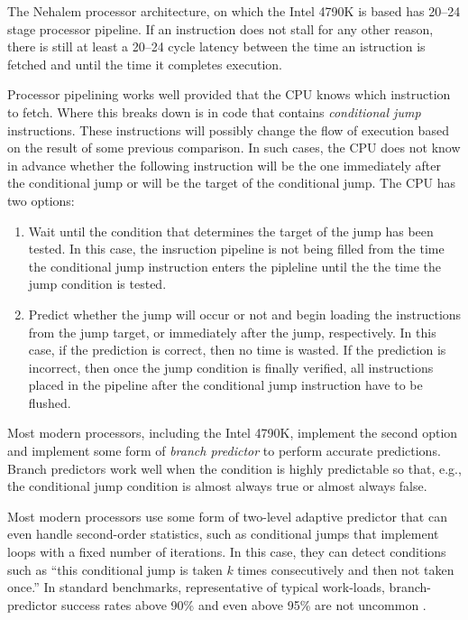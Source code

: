 \documentclass{patmorin}
\begin{document}
The Nehalem processor architecture, on which the Intel 4790K is based has
20--24 stage processor pipeline. If an instruction does not stall for any
other reason, there is still at least a 20--24 cycle latency between the
time an istruction is fetched and until the time it completes execution.

Processor pipelining works well provided that the CPU knows which
instruction to fetch.  Where this breaks down is in code that contains
\emph{conditional jump} instructions. These instructions will possibly
change the flow of execution based on the result of some previous
comparison.  In such cases, the CPU does not know in advance whether the
following instruction will be the one immediately after the conditional
jump or will be the target of the conditional jump. The CPU has two
options:
\begin{enumerate}
  \item Wait until the condition that determines the target
   of the jump has been tested. In this case, the insruction pipeline
   is not being filled from the time the conditional jump instruction
   enters the pipleline until the the time the jump condition is tested.

  \item Predict whether the jump will occur or not and begin loading
  the instructions from the jump target, or immediately after the jump,
  respectively.  In this case, if the prediction is correct, then no
  time is wasted. If the prediction is incorrect, then once the jump
  condition is finally verified, all instructions placed in the pipeline
  after the conditional jump instruction have to be flushed.
\end{enumerate}

Most modern processors, including the Intel 4790K, implement the second
option and implement some form of \emph{branch predictor} to perform
accurate predictions.  Branch predictors work well when the condition is
highly predictable so that, e.g., the conditional jump condition is almost
always true or almost always false.

Most modern processors use some form of two-level adaptive predictor
\cite{yeh.patt.two-level} that can even handle second-order statistics,
such as conditional jumps that implement loops with a fixed number of
iterations. In this case, they can detect conditions such as ``this
conditional jump is taken $k$ times consecutively and then not taken
once.''  In standard benchmarks, representative of typical work-loads,
branch-predictor success rates above 90\% and even above 95\% are not
uncommon \cite{X}.
\end{document}
